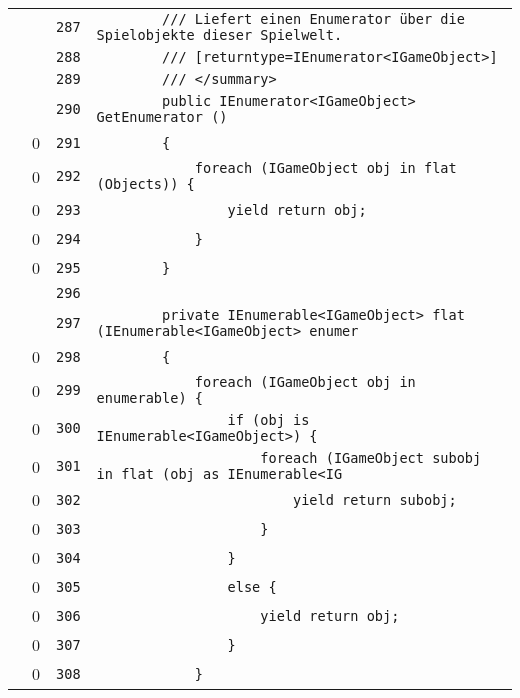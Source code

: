 \documentclass[a4paper,10pt]{article}
\begin{document}
\begin{longtable}[l]{lrrl}
\cellcolor{gray} &  & \verb~287~ & \verb~        /// Liefert einen Enumerator über die Spielobjekte dieser Spielwelt.~\\
\cellcolor{gray} &  & \verb~288~ & \verb~        /// [returntype=IEnumerator<IGameObject>]~\\
\cellcolor{gray} &  & \verb~289~ & \verb~        /// </summary>~\\
\cellcolor{gray} &  & \verb~290~ & \verb~        public IEnumerator<IGameObject> GetEnumerator ()~\\
\cellcolor{red} & 0 & \verb~291~ & \verb~        {~\\
\cellcolor{red} & 0 & \verb~292~ & \verb~            foreach (IGameObject obj in flat (Objects)) {~\\
\cellcolor{red} & 0 & \verb~293~ & \verb~                yield return obj;~\\
\cellcolor{red} & 0 & \verb~294~ & \verb~            }~\\
\cellcolor{red} & 0 & \verb~295~ & \verb~        }~\\
\cellcolor{gray} &  & \verb~296~ & \verb~~\\
\cellcolor{gray} &  & \verb~297~ & \verb~        private IEnumerable<IGameObject> flat (IEnumerable<IGameObject> enumer~\\
\cellcolor{red} & 0 & \verb~298~ & \verb~        {~\\
\cellcolor{red} & 0 & \verb~299~ & \verb~            foreach (IGameObject obj in enumerable) {~\\
\cellcolor{red} & 0 & \verb~300~ & \verb~                if (obj is IEnumerable<IGameObject>) {~\\
\cellcolor{red} & 0 & \verb~301~ & \verb~                    foreach (IGameObject subobj in flat (obj as IEnumerable<IG~\\
\cellcolor{red} & 0 & \verb~302~ & \verb~                        yield return subobj;~\\
\cellcolor{red} & 0 & \verb~303~ & \verb~                    }~\\
\cellcolor{red} & 0 & \verb~304~ & \verb~                }~\\
\cellcolor{red} & 0 & \verb~305~ & \verb~                else {~\\
\cellcolor{red} & 0 & \verb~306~ & \verb~                    yield return obj;~\\
\cellcolor{red} & 0 & \verb~307~ & \verb~                }~\\
\cellcolor{red} & 0 & \verb~308~ & \verb~            }~\\

\end{longtable}
\end{document}
